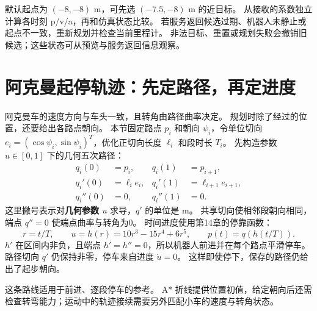 默认起点为 $(-8,-8)$ m，可先选 $(-7.5,-8)$ m 的近目标。
 从接收的系数独立计算各时刻 p/v/a，再和仿真状态比较。
若服务返回候选过期、机器人未静止或起点不一致，重新规划并检查当前里程计。
非法目标、重置或规划失败会撤销旧候选；这些状态可从预览与服务返回信息观察。

\section{阿克曼起停轨迹：先定路径，再定进度}\label{sec:ackplan}
阿克曼车的速度方向与车头一致，且转角由路径曲率决定。
规划时除了经过的位置，还要给出各路点朝向。
本节固定路点 $p_i$ 和朝向 $\psi_i$，令单位切向
$e_i=(\cos\psi_i,\sin\psi_i)^T$，优化正切向长度 $\ell_i$ 和段时长 $T_i$。
先构造参数 $u\in[0,1]$ 下的几何五次路径：
\begin{equation}
 \begin{aligned}
 q_i(0)&=p_i,&q_i(1)&=p_{i+1},\\
 q_i'(0)&=\ell_ie_i,&q_i'(1)&=\ell_{i+1}e_{i+1},\\
 q_i''(0)&=0,&q_i''(1)&=0.
 \end{aligned}
 \label{eq:ack-geometric-boundary}
\end{equation}
这里撇号表示对\textbf{几何参数 $u$} 求导，$q'$ 的单位是 m。
共享切向使相邻段朝向相同，端点 $q''=0$ 使端点曲率与转角为0。
时间进度使用第14章的停靠函数：
\[
 r=t/T,\qquad u=h(r)=10r^3-15r^4+6r^5,\qquad p(t)=q(h(t/T)).
\]
$h'$ 在区间内非负，且端点 $h'=h''=0$，所以机器人前进并在每个路点平滑停车。
路径切向 $q'$ 仍保持非零，停车来自进度 $\dot u=0$。
这样即使停下，保存的路径仍给出了起步朝向。

\begin{center}\begin{minipage}{\linewidth}\makeatletter{}\makeatother
\centering
{}
\caption{路径形状和时间进度分别保存。延长时长会降低速度与加速度，路径曲率保持不变。左图几何坐标采用相同比例。}
\end{minipage}\end{center}
这条路线适用于前进、逐段停车的参考。
A* 折线提供位置初值，给定朝向后还需检查转弯能力；运动中的轨迹接续需要另外匹配小车的速度与转角状态。

